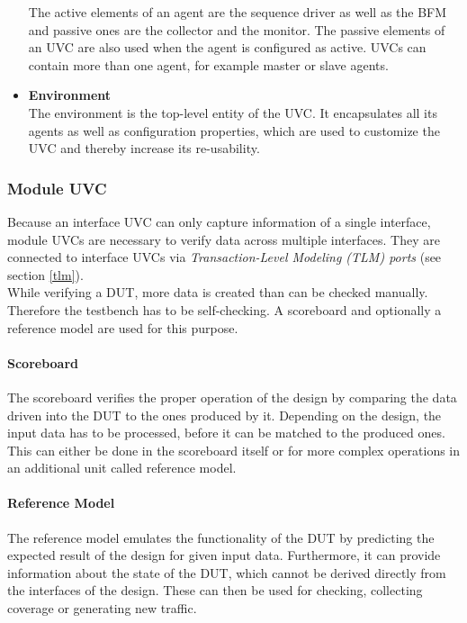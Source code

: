 \begin{itemize}
  The active elements of an agent are the sequence driver as well as the BFM and passive ones are the collector and the monitor. 
  The passive elements of an UVC are also used when the agent is configured as active. 
  UVCs can contain more than one agent, for example master or slave agents.
  \item \textbf{Environment}\\
  The environment is the top-level entity of the UVC. 
  It encapsulates all its agents as well as configuration properties, which are used to customize the UVC and thereby increase its re-usability.
\end{itemize}

\subsubsection{Module UVC}\label{module_uvc}

Because an interface UVC can only capture information of a single interface, module UVCs are necessary to verify data across multiple interfaces. 
They are connected to interface UVCs via \emph{Transaction-Level Modeling (TLM) ports} (see section \ref{tlm}).\\
While verifying a DUT, more data is created than can be checked manually.
Therefore the testbench has to be self-checking.
A scoreboard and optionally a reference model are used for this purpose.

\paragraph{Scoreboard}
The scoreboard verifies the proper operation of the design by comparing the data driven into the DUT to the ones produced by it.
Depending on the design, the input data has to be processed, before it can be matched to the produced ones.
This can either be done in the scoreboard itself or for more complex operations in an additional unit called reference model.

\paragraph{Reference Model}
The reference model emulates the functionality of the DUT by predicting the expected result of the design for given input data.
Furthermore, it can provide information about the state of the DUT, which cannot be derived directly from the interfaces of the design.
These can then be used for checking, collecting coverage or generating new traffic.\\

